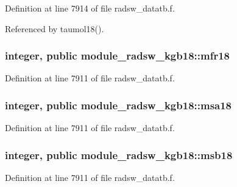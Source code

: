 Definition at line 7914 of file radsw\+\_\+datatb.\+f.



Referenced by taumol18().

\subsubsection[{\texorpdfstring{mfr18}{mfr18}}]{\setlength{\rightskip}{0pt plus 5cm}integer, public module\+\_\+radsw\+\_\+kgb18\+::mfr18}\hypertarget{namespacemodule__radsw__kgb18_a9fa8140413e7ec769baea4f207e58393}{}\label{namespacemodule__radsw__kgb18_a9fa8140413e7ec769baea4f207e58393}


Definition at line 7911 of file radsw\+\_\+datatb.\+f.

\subsubsection[{\texorpdfstring{msa18}{msa18}}]{\setlength{\rightskip}{0pt plus 5cm}integer, public module\+\_\+radsw\+\_\+kgb18\+::msa18}\hypertarget{namespacemodule__radsw__kgb18_a48213008c9ed8f94aaad4ef327d38583}{}\label{namespacemodule__radsw__kgb18_a48213008c9ed8f94aaad4ef327d38583}


Definition at line 7911 of file radsw\+\_\+datatb.\+f.

\subsubsection[{\texorpdfstring{msb18}{msb18}}]{\setlength{\rightskip}{0pt plus 5cm}integer, public module\+\_\+radsw\+\_\+kgb18\+::msb18}\hypertarget{namespacemodule__radsw__kgb18_ad2e52d9beb90328236a351926d1a3432}{}\label{namespacemodule__radsw__kgb18_ad2e52d9beb90328236a351926d1a3432}


Definition at line 7911 of file radsw\+\_\+datatb.\+f.

